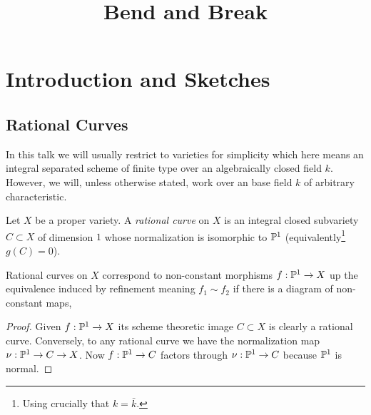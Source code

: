 \documentclass[12pt]{article}
\begin{document}
\title{Bend and Break}

\maketitle

\tableofcontents

\section{Introduction and Sketches}

\subsection{Rational Curves}

\begin{rmk}
In this talk we will usually restrict to varieties for simplicity which here means an integral separated scheme of finite type over an algebraically closed field $k$. However, we will, unless otherwise stated, work over an base field $k$ of arbitrary characteristic.
\end{rmk}

\begin{defn}
Let $X$ be a proper variety. A \textit{rational curve} on $X$ is an integral closed subvariety $C \subset X$ of dimension $1$ whose normalization is isomorphic to $\P^1$ (equivalently\footnote{Using crucially that $k = \bar{k}$.} $g(C) = 0$).
\end{defn}

\begin{prop}
Rational curves on $X$ correspond to non-constant morphisms $f : \P^1 \to X$ up the equivalence induced by refinement meaning $f_1 \sim f_2$ if there is a diagram of non-constant maps,
\begin{center}
\end{center}
\end{prop}

\begin{proof}
Given $f : \P^1 \to X$ its scheme theoretic image $C \subset X$ is clearly a rational curve. Conversely, to any rational curve we have the normalization map $\nu : \P^1 \to C \to X$. Now $f : \P^1 \to C$ factors through $\nu : \P^1 \to C$ because $\P^1$ is normal. 
\end{proof}
\end{document}
